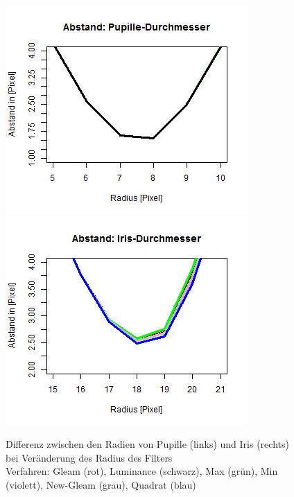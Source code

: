 \begin{figure}
	\centering
	\includegraphics[width=0.49\linewidth]{Eye_Img_Box/Vergleich_P}
	\includegraphics[width=0.49\linewidth]{Eye_Img_Box/Vergleich_I}
	\caption{Differenz zwischen den Radien von Pupille (links) und Iris (rechts) bei Veränderung des Radius des Filters\\
		Verfahren: Gleam (rot), Luminance (schwarz), Max (grün), Min (violett), New-Gleam (grau), Quadrat (blau)}
	\label{img_vergleich_PI}
\end{figure}
